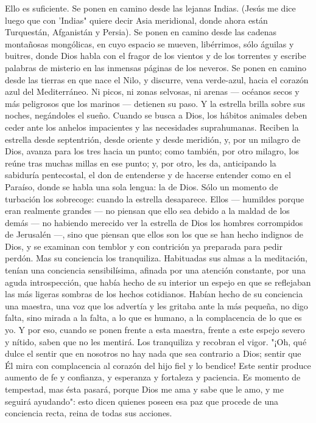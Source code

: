 \documentclass[12pt]{book} %
\begin{document}
Ello es suficiente. Se ponen en camino desde las lejanas Indias. (Jesús me dice luego que con 'Indias" quiere decir Asia meridional, donde ahora están Turquestán, Afganistán y Persia). Se ponen en camino desde las cadenas montañosas mongólicas, en cuyo espacio se mueven, libérrimos, sólo águilas y buitres, donde Dios habla con el fragor de los vientos y de los torrentes y escribe palabras de misterio en las inmensas páginas de los neveros. Se ponen en camino desde las tierras en que nace el Nilo, y discurre, vena verde-azul, hacia el corazón azul del Mediterráneo. Ni picos, ni zonas selvosas, ni arenas — océanos secos y más peligrosos que los marinos — detienen su paso. Y la estrella brilla sobre sus noches, negándoles el sueño. Cuando se busca a Dios, los hábitos animales deben ceder ante los anhelos impacientes y las necesidades suprahumanas. 
Reciben la estrella desde septentrión, desde oriente y desde meridión, y, por un milagro de Dios, avanza para los tres 
hacia un punto; como también, por otro milagro, los reúne tras muchas millas en ese punto; y, por otro, les da, anticipando la sabiduría pentecostal, el don de entenderse y de hacerse entender como en el Paraíso, donde se habla una sola lengua: la de Dios. 
Sólo un momento de turbación los sobrecoge: cuando la estrella desaparece. Ellos — humildes porque eran realmente grandes — no piensan que ello sea debido a la maldad de los demás — no habiendo merecido ver la estrella de Dios los hombres corrompidos de Jerusalén —, sino que piensan que ellos son los que se han hecho indignos de Dios, y se examinan con temblor y con contrición ya preparada para pedir perdón. 
Mas su conciencia los tranquiliza. Habituadas sus almas a la meditación, tenían una conciencia sensibilísima, afinada por una atención constante, por una aguda introspección, que había hecho de su interior un espejo en que se reflejaban las más ligeras sombras de los hechos cotidianos. Habían hecho de su conciencia una maestra, una voz que los advertía y les gritaba ante la más pequeña, no digo falta, sino mirada a la falta, a lo que es humano, a la complacencia de lo que es yo. Y por eso, cuando se ponen frente a esta maestra, frente a este espejo severo y nítido, saben que no les mentirá. Los tranquiliza y recobran el vigor. 
"¡Oh, qué dulce el sentir que en nosotros no hay nada que sea contrario a Dios; sentir que Él mira con complacencia al corazón del hijo fiel y lo bendice! Este sentir produce aumento de fe y confianza, y esperanza y fortaleza y paciencia. Es momento de tempestad, mas ésta pasará, porque Dios me ama y sabe que le amo, y me seguirá ayudando": esto dicen quienes poseen esa paz que procede de una conciencia recta, reina de todas sus acciones. 
\end{document}

